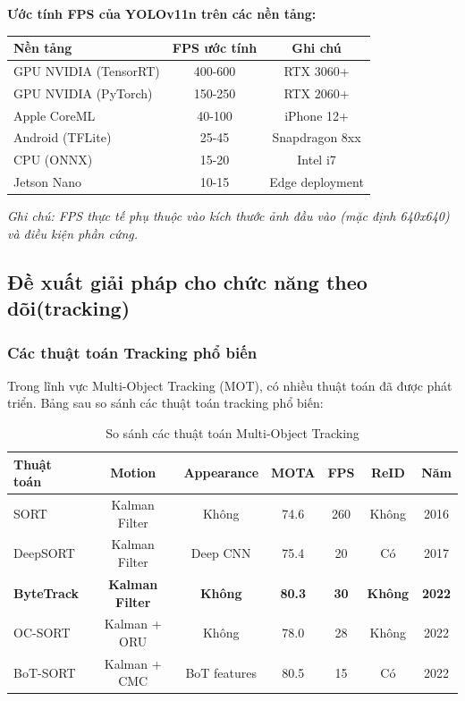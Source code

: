 \textbf{Ước tính FPS của YOLOv11n trên các nền tảng:}

\begin{center}
\begin{tabular}{|l|c|c|}
\hline
\textbf{Nền tảng} & \textbf{FPS ước tính} & \textbf{Ghi chú} \\
\hline
GPU NVIDIA (TensorRT) & 400-600 & RTX 3060+ \\
GPU NVIDIA (PyTorch) & 150-250 & RTX 2060+ \\
Apple CoreML & 40-100 & iPhone 12+ \\
Android (TFLite) & 25-45 & Snapdragon 8xx \\
CPU (ONNX) & 15-20 & Intel i7 \\
Jetson Nano & 10-15 & Edge deployment \\
\hline
\end{tabular}
\end{center}

\textit{Ghi chú: FPS thực tế phụ thuộc vào kích thước ảnh đầu vào (mặc định 640x640) và điều kiện phần cứng.}

\subsection{Đề xuất giải pháp cho chức năng theo dõi(tracking)}
\subsubsection{Các thuật toán Tracking phổ biến}

Trong lĩnh vực Multi-Object Tracking (MOT), có nhiều thuật toán đã được phát triển. Bảng sau so sánh các thuật toán tracking phổ biến:

\begin{table}[h!]
\centering
\caption{So sánh các thuật toán Multi-Object Tracking}
\small
\begin{tabular}{|l|c|c|c|c|c|c|}
\hline
\textbf{Thuật toán} & \textbf{Motion} & \textbf{Appearance} & \textbf{MOTA} & \textbf{FPS} & \textbf{ReID} & \textbf{Năm} \\
\hline
SORT & Kalman Filter & Không & 74.6 & 260 & Không & 2016 \\
\hline
DeepSORT & Kalman Filter & Deep CNN & 75.4 & 20 & Có & 2017 \\
\hline
\textbf{ByteTrack} & \textbf{Kalman Filter} & \textbf{Không} & \textbf{80.3} & \textbf{30} & \textbf{Không} & \textbf{2022} \\
\hline
OC-SORT & Kalman + ORU & Không & 78.0 & 28 & Không & 2022 \\
\hline
BoT-SORT & Kalman + CMC & BoT features & 80.5 & 15 & Có & 2022 \\
\hline
\end{tabular}
\label{tab:tracking_comparison}
\end{table}

